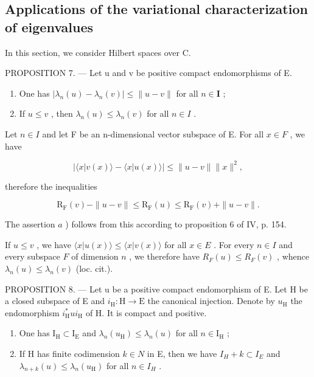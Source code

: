 \subsection{Applications of the variational characterization of eigenvalues}

In this section, we consider Hilbert spaces over C.

PROPOSITION 7. --- Let u and v be positive compact endomorphisms of E.

\begin{enumerate}
\def\labelenumi{\alph{enumi})}
\item
  One has \(|\lambda_n(u) - \lambda_n(v)|\leqslant \| u - v\|\) for all \(n\in \mathbf{I}\) ;
\item
  If \(u \leqslant v\) , then \(\lambda_n(u) \leqslant \lambda_n(v)\) for all \(n \in I\) .
\end{enumerate}

Let \(n \in I\) and let F be an n-dimensional vector subspace of E. For all \(x \in F\) , we have

\[
| \langle x | v (x) \rangle - \langle x | u (x) \rangle | \leqslant \| u - v \| \| x \| ^ {2},
\]

therefore the inequalities

\[
\mathrm{R} _ {\mathrm{F}} (v) - \| u - v \| \leqslant \mathrm{R} _ {\mathrm{F}} (u) \leqslant \mathrm{R} _ {\mathrm{F}} (v) + \| u - v \|.
\]

The assertion \(a\) ) follows from this according to proposition 6 of IV, p. 154.

If \(u \leqslant v\) , we have \(\langle x | u(x) \rangle \leqslant \langle x | v(x) \rangle\) for all \(x \in E\) . For every \(n \in I\) and every subspace \(F\) of dimension \(n\) , we therefore have \(R_F(u) \leqslant R_F(v)\) , whence \(\lambda_n(u) \leqslant \lambda_n(v)\) (loc. cit.).

PROPOSITION 8. --- Let u be a positive compact endomorphism of E. Let H be a closed subspace of E and \(i_{\mathrm{H}}: \mathrm{H} \to \mathrm{E}\) the canonical injection. Denote by \(u_{\mathrm{H}}\) the endomorphism \(i_{\mathrm{H}}^{*}ui_{\mathrm{H}}\) of H. It is compact and positive.

\begin{enumerate}
\def\labelenumi{\alph{enumi})}
\item
  One has \(\mathrm{I_H}\subset \mathrm{I_E}\) and \(\lambda_n(u_{\mathrm{H}})\leqslant \lambda_n(u)\) for all \(n\in \mathrm{I_H}\) ;
\item
  If H has finite codimension \(k \in N\) in E, then we have \(I_{H} + k \subset I_{E}\) and \(\lambda_{n+k}(u) \leqslant \lambda_{n}(u_{\mathrm{H}})\) for all \(n \in I_{H}\) .
\end{enumerate}

